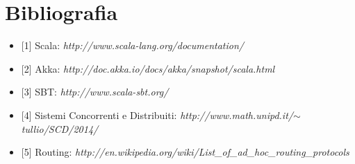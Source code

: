 \documentclass{article}
\newcommand{\Versione}{1.0}
\begin{document}
\newpage

\pagestyle{fancy}

\chead{}
\rhead{
	\color{black}
	\bfseries \textsf{\normalsize v.\Versione\\} 
}
\section{Bibliografia}
\begin{itemize}
\item {[1]} Scala: \textit{http://www.scala-lang.org/documentation/}
\item {[2]} Akka: \textit{http://doc.akka.io/docs/akka/snapshot/scala.html}
\item {[3]} SBT: \textit{http://www.scala-sbt.org/}
\item {[4]} Sistemi Concorrenti e Distribuiti: \textit{http://www.math.unipd.it/$\sim$tullio/SCD/2014/}
\item {[5]} Routing: \textit{http://en.wikipedia.org/wiki/List\_of\_ad\_hoc\_routing\_protocols}
\end{itemize}
\begin{midpage}
\begin{center}
\null
\end{center}
\end{midpage}
\end{document}
